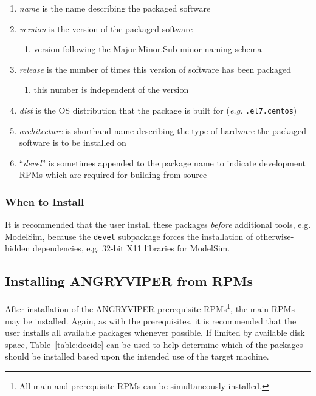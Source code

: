 \begin{enumerate}
	\setcounter{enumi}{0} %
 	\item \textit{name} is the name describing the packaged software
 	\item \textit{version} is the version of the packaged software
 	\begin{enumerate}
	 	\item version following the Major.Minor.Sub-minor naming schema
	\end{enumerate}
 	\item \textit{release} is the number of times this version of software has been packaged
	\begin{enumerate}
	 	\item{this number is independent of the version}
	 \end{enumerate}
 	\item \textit{dist} is the OS distribution that the package is built for (\textit{e.g.} \texttt{.el7.centos})
 	\item \textit{architecture} is shorthand name describing the type of hardware the packaged software is to be installed on
 	\item ``\textit{devel}'' is sometimes appended to the package name to indicate development RPMs which are required for building from source
\end{enumerate}

\subsubsection*{When to Install}
It is recommended that the user install these packages \textit{before} additional tools, e.g. ModelSim, because the \texttt{devel} subpackage forces the installation of otherwise-hidden dependencies, e.g. 32-bit X11 libraries for ModelSim.

\subsection{Installing ANGRYVIPER from RPMs}
\label{sec:install_av_rpm}
After installation of the ANGRYVIPER prerequisite RPMs\footnote{All main and prerequisite RPMs can be simultaneously installed.}, the main RPMs may be installed. Again, as with the prerequisites, it is recommended that the user installs all available packages whenever possible. If limited by available disk space, Table~\ref{table:decide} can be used to help determine which of the packages should be installed based upon the intended use of the target machine.\\

